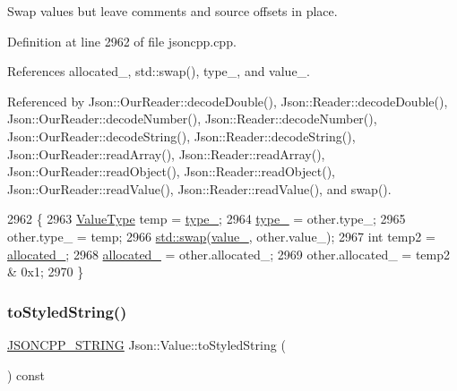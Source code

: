 Swap values but leave comments and source offsets in place. 



Definition at line 2962 of file jsoncpp.\+cpp.



References allocated\+\_\+, std\+::swap(), type\+\_\+, and value\+\_\+.



Referenced by Json\+::\+Our\+Reader\+::decode\+Double(), Json\+::\+Reader\+::decode\+Double(), Json\+::\+Our\+Reader\+::decode\+Number(), Json\+::\+Reader\+::decode\+Number(), Json\+::\+Our\+Reader\+::decode\+String(), Json\+::\+Reader\+::decode\+String(), Json\+::\+Our\+Reader\+::read\+Array(), Json\+::\+Reader\+::read\+Array(), Json\+::\+Our\+Reader\+::read\+Object(), Json\+::\+Reader\+::read\+Object(), Json\+::\+Our\+Reader\+::read\+Value(), Json\+::\+Reader\+::read\+Value(), and swap().


\begin{DoxyCode}
2962                                     \{
2963   \hyperlink{namespace_json_a7d654b75c16a57007925868e38212b4e}{ValueType} temp = \hyperlink{class_json_1_1_value_abd222c2536dc88bf330dedcd076d2356}{type\_};
2964   \hyperlink{class_json_1_1_value_abd222c2536dc88bf330dedcd076d2356}{type\_} = other.type\_;
2965   other.type\_ = temp;
2966   \hyperlink{namespacestd_a22cc6fcbbb1f2f705c7888b615e43582}{std::swap}(\hyperlink{class_json_1_1_value_aef578244546212705b9f81eb84d7e151}{value\_}, other.value\_);
2967   \textcolor{keywordtype}{int} temp2 = \hyperlink{class_json_1_1_value_ae0126c80dc4907aad94088553fc7632b}{allocated\_};
2968   \hyperlink{class_json_1_1_value_ae0126c80dc4907aad94088553fc7632b}{allocated\_} = other.allocated\_;
2969   other.allocated\_ = temp2 & 0x1;
2970 \}
\end{DoxyCode}
\mbox{\label{class_json_1_1_value_a00154cc8662d7a845ed59e175c2496cb}} 
\subsubsection{\texorpdfstring{to\+Styled\+String()}{toStyledString()}}
{\footnotesize\ttfamily \hyperlink{json_8h_a1e723f95759de062585bc4a8fd3fa4be}{J\+S\+O\+N\+C\+P\+P\+\_\+\+S\+T\+R\+I\+NG} Json\+::\+Value\+::to\+Styled\+String (\begin{DoxyParamCaption}{ }\end{DoxyParamCaption}) const}



